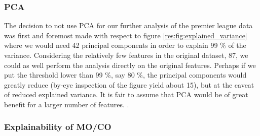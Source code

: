 \subsubsection{PCA}
    The decision to not use PCA for our further analysis of the premier league data was first and foremost made with respect to figure \ref{res:fig:explained_variance} where we would need 42 principal components in order to explain 99 \% of the variance. Considering the relatively few features in the original dataset, 87, we could as well perform the analysis directly on the original features. Perhaps if we put the threshold lower than 99 \%, say 80 \%, the principal components would greatly reduce (by-eye inspection of the figure yield about 15), but at the caveat of reduced explained variance. It is fair to assume that PCA would be of great benefit for a larger number of features. . 
    

\subsubsection{Explainability of MO/CO}
